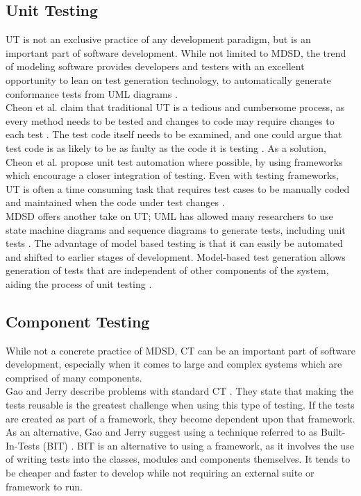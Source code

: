 \documentclass[fina_report_innit.tex]{subfiles}
\begin{document}
\subsection{Unit Testing}
UT is not an exclusive practice of any development paradigm, but is an important part of software development. While not limited to MDSD, the trend of modeling software provides developers and testers with an excellent opportunity to lean on test generation technology, to automatically generate conformance tests from UML diagrams \cite{mussa2009survey} \cite{hartmann2004uml}.  
\\

Cheon et al. claim that traditional UT is a tedious and cumbersome process, as every method needs to be tested and changes to code may require changes to each test \cite{cheon2002simple}. The test code itself needs to be examined, and one could argue that test code is as likely to be as faulty as the code it is testing \cite{cheon2002simple}. As a solution, Cheon et al. propose unit test automation where possible, by using frameworks which encourage a closer integration of testing. Even with testing frameworks, UT is often a time consuming task that requires test cases to be manually coded and maintained when the code under test changes \cite{cheon2002simple}.
\\

MDSD offers another take on UT; UML has allowed many researchers to use state machine diagrams and sequence diagrams to generate tests, including unit tests \cite{mussa2009survey}. The advantage of model based testing is that it can easily be automated and shifted to earlier stages of development. Model-based test generation allows generation of tests that are independent of other components of the system, aiding the process of unit testing \cite{javed2007automated}.

\subsection{Component Testing}
While not a concrete practice of MDSD, CT can be an important part of software development, especially when it comes to large and complex systems which are comprised of many components.
\\

Gao and Jerry describe problems with standard CT \cite{gao2000component}. They state that making the tests reusable is the greatest challenge when using this type of testing. If the tests are created as part of a framework, they become dependent upon that framework. As an alternative, Gao and Jerry suggest using a technique referred to as Built-In-Tests (BIT) \cite{gao2000component}. BIT is an alternative to using a framework, as it involves the use of writing tests into the classes, modules and components themselves. It tends to be cheaper and faster to develop while not requiring an external suite or framework to run.
\\
\end{document}
